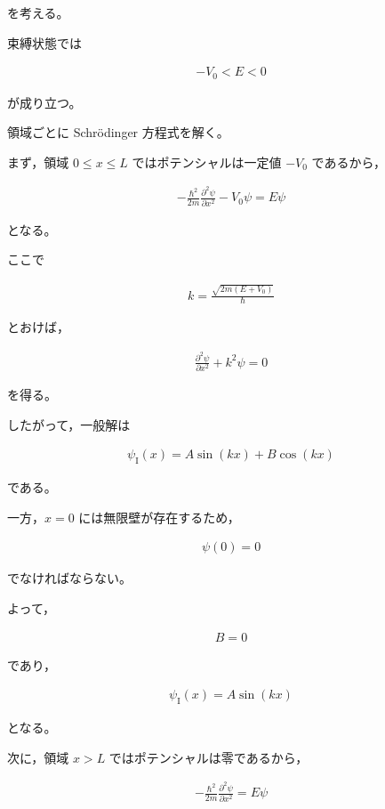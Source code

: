 \documentclass[platex,dvipdfmx,a4paper]{jsarticle}
\newcommand{\nhb}[3]{\frac{\partial^{#1} #2}{\partial #3^{#1}}}
\begin{document}
を考える。

束縛状態では

\begin{align*}
-V_0<E<0
\end{align*}

が成り立つ。

領域ごとに Schr\"odinger 方程式を解く。

まず，領域 $0\le x\le L$ ではポテンシャルは一定値 $-V_0$ であるから，

\begin{align*}
-\frac{\hbar^2}{2m}
\nhb{2}{\psi}{x}
-V_0\psi
=
E\psi
\end{align*}

となる。

ここで

\begin{align*}
k
=
\frac{\sqrt{2m(E+V_0)}}{\hbar}
\end{align*}

とおけば，

\begin{align*}
\nhb{2}{\psi}{x}
+k^2\psi
=
0
\end{align*}

を得る。

したがって，一般解は

\begin{align*}
\psi_{\mathrm I}(x)
=
A\sin(kx)
+
B\cos(kx)
\end{align*}

である。

一方，$x=0$ には無限壁が存在するため，

\begin{align*}
\psi(0)=0
\end{align*}

でなければならない。

よって，

\begin{align*}
B=0
\end{align*}

であり，

\begin{align*}
\psi_{\mathrm I}(x)
=
A\sin(kx)
\end{align*}

となる。

次に，領域 $x>L$ ではポテンシャルは零であるから，

\begin{align*}
-\frac{\hbar^2}{2m}
\nhb{2}{\psi}{x}
=
E\psi
\end{align*}
\end{document}
